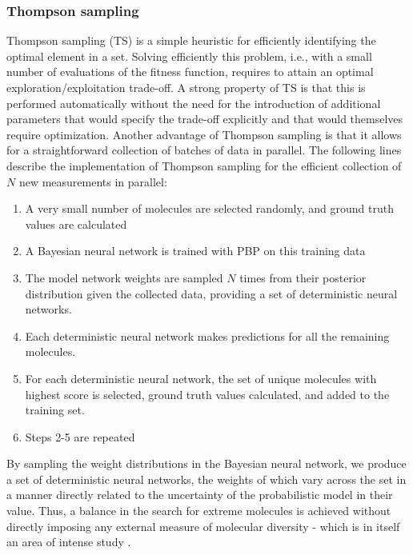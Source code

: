 \subsubsection{Thompson sampling}

Thompson sampling (TS) \cite{Thompson_1933} is a simple heuristic for efficiently identifying the optimal element in a set. Solving efficiently this problem, i.e., with a small number of evaluations of the fitness function, requires to attain an optimal exploration/exploitation trade-off. A strong property of TS  is that this is performed automatically without the need for the introduction of additional parameters that would specify the trade-off explicitly and that would themselves require optimization. Another advantage of Thompson sampling is that it allows for a straightforward collection of batches of data in parallel. The following lines describe the implementation of Thompson sampling for the efficient collection of $N$ new measurements in parallel:
\begin{enumerate}
\item A very small number of molecules are selected randomly, and ground truth values are calculated
\item A Bayesian neural network is trained with PBP on this training data
\item The model network weights are sampled $N$ times from their posterior distribution given the collected data, providing a set of deterministic neural networks.
\item Each deterministic neural network makes predictions for all the remaining molecules.
\item For each deterministic neural network, the set of unique molecules with highest score is selected, ground truth values calculated, and added to the training set.
\item Steps 2-5 are repeated
\end{enumerate}
By sampling the weight distributions in the Bayesian neural network, we produce a set of deterministic neural networks, the weights of which vary across the set in a manner directly related to the uncertainty of the probabilistic model in their value.  Thus, a balance in the search for extreme molecules is achieved without directly imposing any external measure of molecular diversity - which is in itself an area of intense study \cite{Maldonado_2006}.